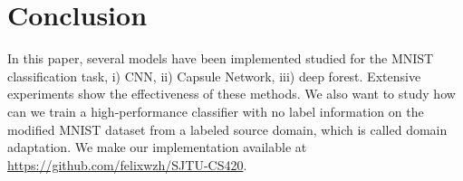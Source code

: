 \documentclass{article} %
\begin{document}
\section*{Conclusion}
In this paper, several models have been implemented studied for the MNIST classification task, i) CNN, ii) Capsule Network, iii) deep forest. Extensive experiments show the effectiveness of these methods. We also want to study how can we train a high-performance classifier with no label information on the modified MNIST dataset from a labeled source domain, which is called domain adaptation. We make our implementation available at \url{https://github.com/felixwzh/SJTU-CS420}.




\end{document}

